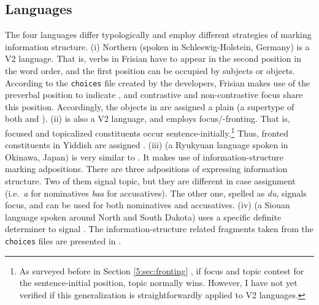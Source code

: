 \subsection{Languages}
\label{12:ssec:lc-lang}

The four languages differ typologically and employ different
strategies of marking information structure.  (i) Northern
 (spoken in Schleswig-Holstein, Germany) is a V2
language. That is, verbs in Frisian have to appear in the second
position in the word order, and the first position can be occupied by
subjects or objects. According to the \texttt{choices} file created by
the developers, Frisian makes use of the preverbal position to
indicate , and contrastive and non-contrastive focus share this
position. Accordingly,
the  objects in  are
assigned a plain  (a supertype of both 
and ).
(ii)  is also a V2 language,
and employs focus/-fronting. That is, focused and topicalized
constituents occur sentence-initially.\footnote{As surveyed before in
  Section \ref{5:sec:fronting} , if focus and topic
  contest for the sentence-initial position, topic normally wins.
  However, I have not yet verified if this generalization is
  straightforwardly applied to V2 languages.} Thus, fronted
constituents in Yiddish are assigned .  (iii)
 (a Ryukyuan language spoken in Okinawa, Japan) is very
similar to . It makes use of information-structure
marking adpositions. There are three adpositions of
expressing information structure. Two of them signal topic, but they
are different in case assignment (i.e.\ \textit{a} for nominatives \vs
\textit{baa} for accusatives). The other one, spelled as \textit{du},
signals focus, and can be used for both nominatives and accusatives.
(iv)  (a Siouan language spoken around North and South
Dakota) uses a specific definite determiner
\textit{} to signal . The
information-structure related fragments taken from the
\texttt{choices} files are presented in .


